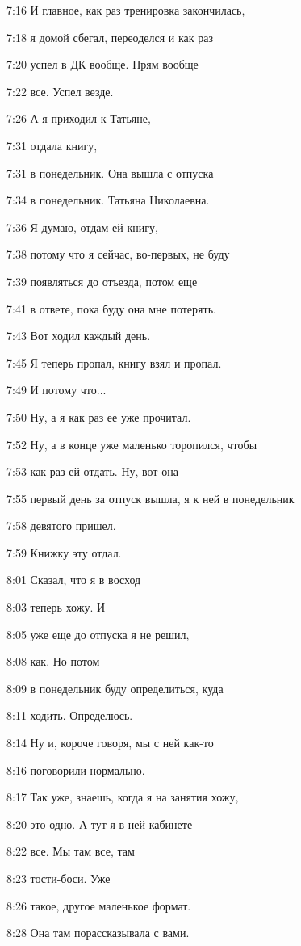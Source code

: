 7:16
И главное, как раз тренировка закончилась,

7:18
я домой сбегал, переоделся и как раз

7:20
успел в ДК вообще. Прям вообще

7:22
все. Успел везде.

7:26
А я приходил к Татьяне,

7:31
отдала книгу,

7:31
в понедельник. Она вышла с отпуска

7:34
в понедельник. Татьяна Николаевна.

7:36
Я думаю, отдам ей книгу,

7:38
потому что я сейчас, во-первых, не буду

7:39
появляться до отъезда, потом еще

7:41
в ответе, пока буду она мне потерять.

7:43
Вот ходил каждый день.

7:45
Я теперь пропал, книгу взял и пропал.

7:49
И потому что...

7:50
Ну, а я как раз ее уже прочитал.

7:52
Ну, а в конце уже маленько торопился, чтобы

7:53
как раз ей отдать. Ну, вот она

7:55
первый день за отпуск вышла, я к ней в понедельник

7:58
девятого пришел.

7:59
Книжку эту отдал.

8:01
Сказал, что я в восход

8:03
теперь хожу. И

8:05
уже еще до отпуска я не решил,

8:08
как. Но потом

8:09
в понедельник буду определиться, куда

8:11
ходить. Определюсь.

8:14
Ну и, короче говоря, мы с ней как-то

8:16
поговорили нормально.

8:17
Так уже, знаешь, когда я на занятия хожу,

8:20
это одно. А тут я в ней кабинете

8:22
все. Мы там все, там

8:23
тости-боси. Уже

8:26
такое, другое маленькое формат.

8:28
Она там порассказывала с вами.

